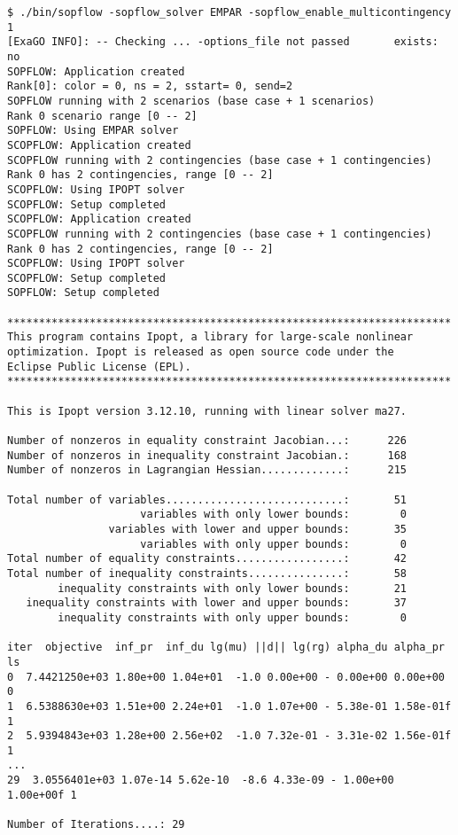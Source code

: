 \begin{lstlisting}
$ ./bin/sopflow -sopflow_solver EMPAR -sopflow_enable_multicontingency 1
[ExaGO INFO]: -- Checking ... -options_file not passed       exists: no
SOPFLOW: Application created
Rank[0]: color = 0, ns = 2, sstart= 0, send=2
SOPFLOW running with 2 scenarios (base case + 1 scenarios)
Rank 0 scenario range [0 -- 2]
SOPFLOW: Using EMPAR solver
SCOPFLOW: Application created
SCOPFLOW running with 2 contingencies (base case + 1 contingencies)
Rank 0 has 2 contingencies, range [0 -- 2]
SCOPFLOW: Using IPOPT solver
SCOPFLOW: Setup completed
SCOPFLOW: Application created
SCOPFLOW running with 2 contingencies (base case + 1 contingencies)
Rank 0 has 2 contingencies, range [0 -- 2]
SCOPFLOW: Using IPOPT solver
SCOPFLOW: Setup completed
SOPFLOW: Setup completed

**********************************************************************
This program contains Ipopt, a library for large-scale nonlinear 
optimization. Ipopt is released as open source code under the 
Eclipse Public License (EPL).
**********************************************************************

This is Ipopt version 3.12.10, running with linear solver ma27.

Number of nonzeros in equality constraint Jacobian...:      226
Number of nonzeros in inequality constraint Jacobian.:      168
Number of nonzeros in Lagrangian Hessian.............:      215

Total number of variables............................:       51
                     variables with only lower bounds:        0
                variables with lower and upper bounds:       35
                     variables with only upper bounds:        0
Total number of equality constraints.................:       42
Total number of inequality constraints...............:       58
        inequality constraints with only lower bounds:       21
   inequality constraints with lower and upper bounds:       37
        inequality constraints with only upper bounds:        0

iter  objective  inf_pr  inf_du lg(mu) ||d|| lg(rg) alpha_du alpha_pr  ls
0  7.4421250e+03 1.80e+00 1.04e+01  -1.0 0.00e+00 - 0.00e+00 0.00e+00   0
1  6.5388630e+03 1.51e+00 2.24e+01  -1.0 1.07e+00 - 5.38e-01 1.58e-01f  1
2  5.9394843e+03 1.28e+00 2.56e+02  -1.0 7.32e-01 - 3.31e-02 1.56e-01f  1
...
29  3.0556401e+03 1.07e-14 5.62e-10  -8.6 4.33e-09 - 1.00e+00 1.00e+00f 1

Number of Iterations....: 29


\end{lstlisting}
